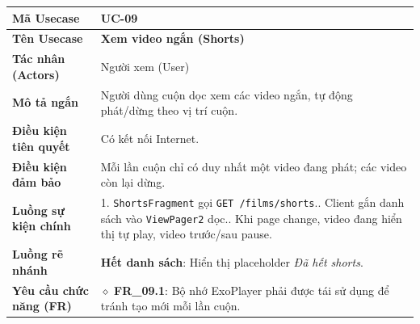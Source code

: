\begin{table}[H]
\renewcommand{\arraystretch}{1.3}
\centering
\begin{tabularx}{\textwidth}{|p{4.5cm}|X|}
\hline
\cellcolor{gray!15}\bfseries Mã Usecase & \textbf{UC-09} \\ \hline
\cellcolor{gray!15}\bfseries Tên Usecase & \textbf{Xem video ngắn (Shorts)} \\ \hline
\cellcolor{gray!15}\bfseries Tác nhân (Actors) & Người xem (User) \\ \hline
\cellcolor{gray!15}\bfseries Mô tả ngắn & Người dùng cuộn dọc xem các video ngắn, tự động phát/dừng theo vị trí cuộn. \\ \hline
\cellcolor{gray!15}\bfseries Điều kiện tiên quyết & Có kết nối Internet. \\ \hline
\cellcolor{gray!15}\bfseries Điều kiện đảm bảo & Mỗi lần cuộn chỉ có duy nhất một video đang phát; các video còn lại dừng. \\ \hline
\cellcolor{gray!15}\bfseries Luồng sự kiện chính & 1. \texttt{ShortsFragment} gọi \texttt{GET /films/shorts}.\newline 2. Client gắn danh sách vào \texttt{ViewPager2} dọc.\newline 3. Khi page change, video đang hiển thị tự play, video trước/sau pause. \\ \hline
\cellcolor{gray!15}\bfseries Luồng rẽ nhánh & \textbf{Hết danh sách}: Hiển thị placeholder \textit{Đã hết shorts}. \\ \hline
\cellcolor{gray!15}\bfseries Yêu cầu chức năng (FR) & $\diamond$ \textbf{FR\_09.1}: Bộ nhớ ExoPlayer phải được tái sử dụng để tránh tạo mới mỗi lần cuộn. \\ \hline
\end{tabularx}
\end{table}

